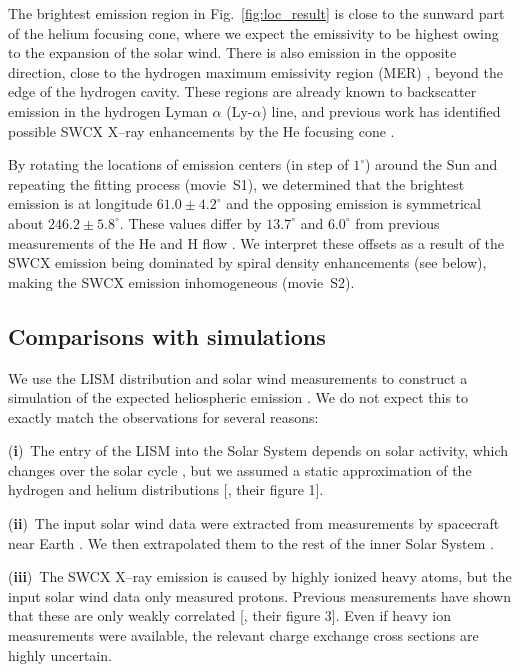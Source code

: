 \documentclass[12pt]{article}
\renewcommand{\deg}{^{\circ}}
\begin{document}
The brightest emission region in Fig.~\ref{fig:loc_result} is close to the sunward part of the helium focusing cone, where we expect the emissivity to be highest owing to the expansion of the solar wind. There is also emission in the opposite direction, close to the hydrogen maximum emissivity region (MER) \cite{que14a}, beyond the edge of the hydrogen cavity. These regions are already known to backscatter emission in the hydrogen Lyman $\alpha$ (Ly-${\alpha}$) line, and previous work has identified possible SWCX X--ray enhancements by the He focusing cone \cite{kou09a,gal14a,upr16a}.

By rotating the locations of emission centers (in step of $1\deg$) around the Sun and repeating the fitting process (movie~S1), we determined that the brightest emission is at longitude $61.0\pm4.2\deg$ and the opposing emission is symmetrical about $246.2\pm5.8\deg$. These values differ by $13.7\deg$ and $6.0\deg$ from previous measurements of the He and H flow \cite{lal05b}. We interpret these offsets as a result of the SWCX emission being dominated by spiral density enhancements (see below), making the SWCX emission inhomogeneous (movie~S2).

\subsection*{Comparisons with simulations}

We use the LISM distribution and solar wind measurements to construct a simulation of the expected heliospheric emission \cite{methods}. We do not expect this to exactly match the observations for several reasons:

({\bf i})~The entry of the LISM into the Solar System depends on solar activity, which changes over the solar cycle \cite{lal04b}, but we assumed a static approximation of the hydrogen and helium distributions [\cite{rin21a}, their figure 1].

({\bf ii})~The input solar wind data were extracted from measurements by spacecraft near Earth
\cite{kin05a}. We then extrapolated them to the rest of the inner Solar System \cite{methods}.

({\bf iii})~The SWCX X--ray emission is caused by highly ionized heavy atoms, but the input solar wind data only measured protons. Previous measurements have shown that these are only weakly correlated [\cite{boc07a}, their figure 3]. Even if heavy ion measurements were available, the relevant charge exchange cross sections are highly uncertain.
\end{document}
